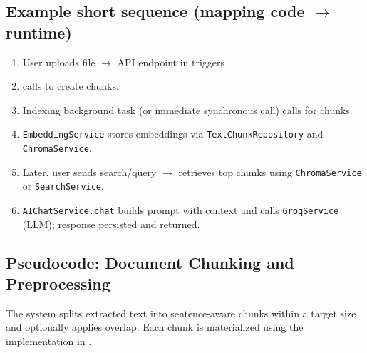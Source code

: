 \subsection*{Example short sequence (mapping code $\rightarrow$ runtime)}
{\small
\begin{enumerate}
    \item User uploads file $\rightarrow$ API endpoint in \texttt{} triggers \texttt{}.
    \item \texttt{} calls \texttt{} to create chunks.
    \item Indexing background task (or immediate synchronous call) calls \texttt{} for chunks.
    \item \texttt{EmbeddingService} stores embeddings via \texttt{TextChunkRepository} and \texttt{ChromaService}.
    \item Later, user sends search/query $\rightarrow$ \texttt{} retrieves top chunks using \texttt{ChromaService} or \texttt{SearchService}.
    \item \texttt{AIChatService.chat} builds prompt with context and calls \texttt{GroqService} (LLM); response persisted and returned.
\end{enumerate}
}

\subsection{Pseudocode: Document Chunking and Preprocessing}

The system splits extracted text into sentence-aware chunks within a target size and optionally applies overlap. Each chunk is materialized using the implementation in \texttt{}.

